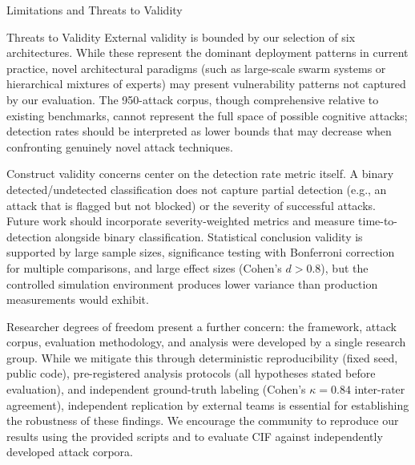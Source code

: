\documentclass[
  ignorenonframetext,
]{beamer}
\begin{document}
\begin{frame}{Limitations and Threats to Validity}
\begin{block}{Threats to Validity}
External validity is bounded by our selection of six architectures.
While these represent the dominant deployment patterns in current
practice, novel architectural paradigms (such as large-scale swarm
systems or hierarchical mixtures of experts) may present vulnerability
patterns not captured by our evaluation. The 950-attack corpus, though
comprehensive relative to existing benchmarks, cannot represent the full
space of possible cognitive attacks; detection rates should be
interpreted as lower bounds that may decrease when confronting genuinely
novel attack techniques.

Construct validity concerns center on the detection rate metric itself.
A binary detected/undetected classification does not capture partial
detection (e.g., an attack that is flagged but not blocked) or the
severity of successful attacks. Future work should incorporate
severity-weighted metrics and measure time-to-detection alongside binary
classification. Statistical conclusion validity is supported by large
sample sizes, significance testing with Bonferroni correction for
multiple comparisons, and large effect sizes (Cohen's \(d > 0.8\)), but
the controlled simulation environment produces lower variance than
production measurements would exhibit.

Researcher degrees of freedom present a further concern: the framework,
attack corpus, evaluation methodology, and analysis were developed by a
single research group. While we mitigate this through deterministic
reproducibility (fixed seed, public code), pre-registered analysis
protocols (all hypotheses stated before evaluation), and independent
ground-truth labeling (Cohen's \(\kappa = 0.84\) inter-rater agreement),
independent replication by external teams is essential for establishing
the robustness of these findings. We encourage the community to
reproduce our results using the provided scripts and to evaluate CIF
against independently developed attack corpora.
\end{block}
\end{frame}
\end{document}
